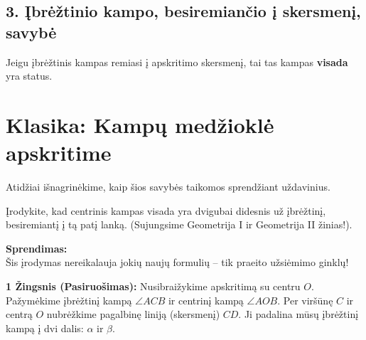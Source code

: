 \documentclass[11pt,a4paper]{scrartcl}
\begin{document}
\subsection*{3. Įbrėžtinio kampo, besiremiančio į skersmenį, savybė}
Jeigu įbrėžtinis kampas remiasi į apskritimo skersmenį, tai tas kampas \textbf{visada} yra status.
\begin{center}
\end{center}

\section{Klasika: Kampų medžioklė apskritime}

Atidžiai išnagrinėkime, kaip šios savybės taikomos sprendžiant uždavinius. 

\begin{example}
Įrodykite, kad centrinis kampas visada yra dvigubai didesnis už įbrėžtinį, besiremiantį į tą patį lanką. (Sujungsime Geometrija I ir Geometrija II žinias!).
\end{example}

\textbf{Sprendimas:}\\
Šis įrodymas nereikalauja jokių naujų formulių – tik praeito užsiėmimo ginklų! 

\textbf{1 Žingsnis (Pasiruošimas):} Nusibraižykime apskritimą su centru $O$. Pažymėkime įbrėžtinį kampą $\angle ACB$ ir centrinį kampą $\angle AOB$. Per viršūnę $C$ ir centrą $O$ nubrėžkime pagalbinę liniją (skersmenį) $CD$. Ji padalina mūsų įbrėžtinį kampą į dvi dalis: $\alpha$ ir $\beta$.
\end{document}
